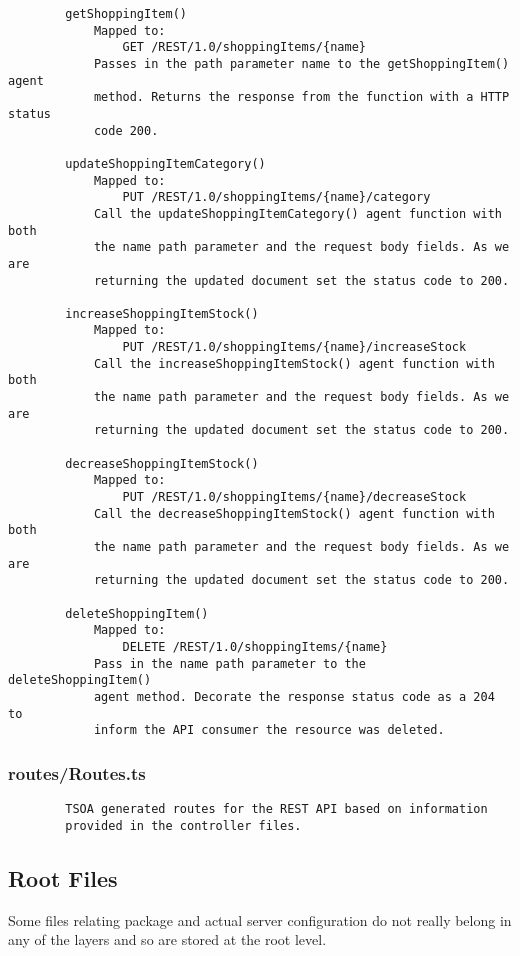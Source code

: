 \begin{verbatim}
        getShoppingItem()
            Mapped to:
                GET /REST/1.0/shoppingItems/{name}
            Passes in the path parameter name to the getShoppingItem() agent
            method. Returns the response from the function with a HTTP status
            code 200.
        
        updateShoppingItemCategory()
            Mapped to:
                PUT /REST/1.0/shoppingItems/{name}/category
            Call the updateShoppingItemCategory() agent function with both
            the name path parameter and the request body fields. As we are
            returning the updated document set the status code to 200.
            
        increaseShoppingItemStock()
            Mapped to:
                PUT /REST/1.0/shoppingItems/{name}/increaseStock
            Call the increaseShoppingItemStock() agent function with both
            the name path parameter and the request body fields. As we are
            returning the updated document set the status code to 200.
            
        decreaseShoppingItemStock()
            Mapped to:
                PUT /REST/1.0/shoppingItems/{name}/decreaseStock
            Call the decreaseShoppingItemStock() agent function with both
            the name path parameter and the request body fields. As we are
            returning the updated document set the status code to 200.
            
        deleteShoppingItem()
            Mapped to:
                DELETE /REST/1.0/shoppingItems/{name}
            Pass in the name path parameter to the deleteShoppingItem()
            agent method. Decorate the response status code as a 204 to
            inform the API consumer the resource was deleted. 
\end{verbatim}
\subsubsection{routes/Routes.ts}
\begin{verbatim}
        TSOA generated routes for the REST API based on information
        provided in the controller files.
\end{verbatim}
\subsection{Root Files}
Some files relating package and actual server configuration do not really belong in any of the layers and so are stored at the root level.
